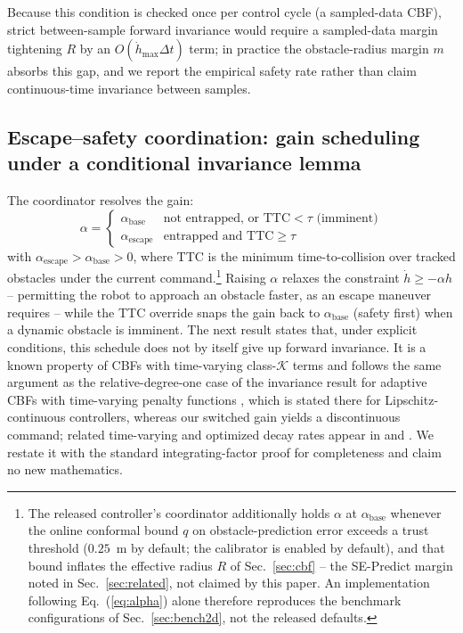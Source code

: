 \documentclass[journal]{IEEEtran}
\begin{document}
Because this condition is checked once per control cycle (a sampled-data
CBF), strict between-sample forward invariance would require a
sampled-data margin tightening $R$ by an $O(\dot h_{\max}\Delta t)$ term;
in practice the obstacle-radius margin $m$ absorbs this gap, and we report
the empirical safety rate rather than claim continuous-time invariance
between samples.

\subsection{Escape--safety coordination: gain scheduling under a conditional invariance lemma}
\label{sec:coordination}

The coordinator resolves the gain:
\begin{equation}
\label{eq:alpha}
\alpha = \begin{cases}
\alpha_\text{base} & \text{not entrapped, or TTC} < \tau \text{ (imminent)}\\
\alpha_\text{escape} & \text{entrapped and TTC} \ge \tau
\end{cases}
\end{equation}
with $\alpha_\text{escape} > \alpha_\text{base} > 0$, where TTC is the
minimum time-to-collision over tracked obstacles under the current
command.\footnote{The released controller's coordinator additionally holds
$\alpha$ at $\alpha_\text{base}$ whenever the online conformal bound $q$ on
obstacle-prediction error exceeds a trust threshold ($0.25$~m by default;
the calibrator is enabled by default), and that bound inflates the
effective radius $R$ of Sec.~\ref{sec:cbf} -- the SE-Predict margin noted
in Sec.~\ref{sec:related}, not claimed by this paper. An implementation
following Eq.~(\ref{eq:alpha}) alone therefore reproduces the benchmark
configurations of Sec.~\ref{sec:bench2d}, not the released defaults.} Raising $\alpha$ relaxes the constraint $\dot h \ge -\alpha h$ --
permitting the robot to approach an obstacle faster, as an escape
maneuver requires -- while the TTC override snaps the gain back to
$\alpha_\text{base}$ (safety first) when a dynamic obstacle is imminent.
The next result states that, under explicit conditions, this schedule
does not by itself give up forward invariance. It is a known property of
CBFs with time-varying class-$\mathcal{K}$ terms and follows the same
argument as the relative-degree-one case of the invariance result for
adaptive CBFs with time-varying penalty functions \cite[Thm.~3]{ada_cbf},
which is stated there for Lipschitz-continuous controllers, whereas our
switched gain yields a discontinuous command; related time-varying and
optimized decay rates appear in \cite{optdecay_cbf} and \cite{rt_cbf}. We
restate it with the standard integrating-factor proof for completeness
and claim no new mathematics.
\end{document}
